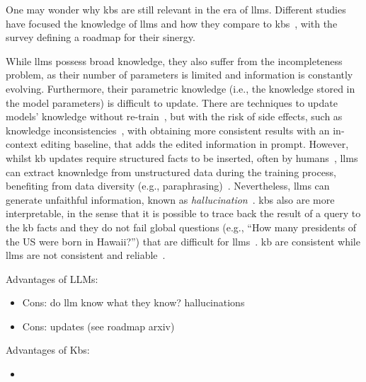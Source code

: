 One may wonder why \acp{kb} are still relevant in the era of \acp{llm}. Different studies have focused the knowledge of \aclp{llm} and how they compare to \aclp{kb}~\cite{petroni-etal-2019-language-models-kbs,heinzerling-inui-2021-language}, with the survey \textcite{kg_llm_roadmap_2024} defining a roadmap for their sinergy.

While \acp{llm} possess broad knowledge, they also suffer from the incompleteness problem, as their number of parameters is limited and information is constantly evolving. Furthermore, their parametric knowledge (i.e., the knowledge stored in the model parameters) is difficult to update. There are techniques to update models' knowledge without re-train~\cite{yao-etal-2023-editing,kg_editing_survey_2024}, but with the risk of side effects, such as knowledge inconsistencies~\cite{li2024unveiling,cohen-etal-2024-rippleeffects}, with \textcite{cohen-etal-2024-rippleeffects} obtaining more consistent results with an in-context editing baseline, that adds the edited information in prompt.
However, whilst \ac{kb} updates require structured facts to be inserted, often by humans~\cite{}, \acp{llm} can extract knownledge from unstructured data during the training process, benefiting from data diversity (e.g., paraphrasing)~\cite{physics_of_lm_3.1_2024}.
Nevertheless, \acp{llm} can generate unfaithful information, known as \emph{hallucination}~\cite{ji_etal-2023-survey-hallucination}.
\acp{kb} also are more interpretable, in the sense that it is possible to trace back the result of a query to the \ac{kb} facts and they do not fail global questions (e.g., ``How many presidents of the US were born in Hawaii?'') that are difficult for \acp{llm}~\cite{physics_of_lm_3.1_2024}.
\ac{kb} are consistent while \acp{llm} are not consistent and reliable~\cite{zheng2024reliablellmsknowledgebases}.

Advantages of LLMs:
\begin{itemize}
    \item Cons: do llm know what they know? hallucinations
    \item Cons: updates (see roadmap arxiv)
\end{itemize}
Advantages of Kbs:
\begin{itemize}
    \item
\end{itemize}


